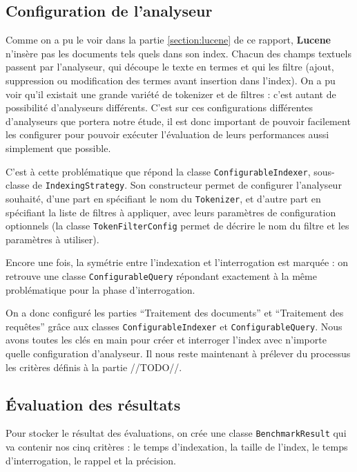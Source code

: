 \subsection{Configuration de l'analyseur}

Comme on a pu le voir dans la partie \ref{section:lucene} de ce rapport, \textbf{Lucene} n’insère pas les documents tels quels dans son index. Chacun des champs textuels passent par l’analyseur, qui découpe le texte en termes et qui les filtre (ajout, suppression ou modification des termes avant insertion dans l’index). On a pu voir qu’il existait une grande variété de tokenizer et de filtres : c’est autant de possibilité d’analyseurs différents. C’est sur ces configurations différentes d’analyseurs que portera notre étude, il est donc important de pouvoir facilement les configurer pour pouvoir exécuter l’évaluation de leurs performances aussi simplement que possible.

C’est à cette problématique que répond la classe \texttt{ConfigurableIndexer}, sous-classe de \texttt{IndexingStrategy}. Son constructeur permet de configurer l’analyseur souhaité, d’une part en spécifiant le nom du \texttt{Tokenizer}, et d’autre part en spécifiant la liste de filtres à appliquer, avec leurs paramètres de configuration optionnels (la classe \texttt{TokenFilterConfig} permet de décrire le nom du filtre et les paramètres à utiliser).

Encore une fois, la symétrie entre l’indexation et l’interrogation est marquée : on retrouve une classe \texttt{ConfigurableQuery} répondant exactement à la même problématique pour la phase d’interrogation.

On a donc configuré les parties “Traitement des documents” et “Traitement des requêtes” grâce aux classes \texttt{ConfigurableIndexer} et \texttt{ConfigurableQuery}. Nous avons toutes les clés en main pour créer et interroger l’index avec n’importe quelle configuration d’analyseur. Il nous reste maintenant à prélever du processus les critères définis à la partie //TODO//.

\subsection{Évaluation des résultats}
\label{section:benchmarkresults}

Pour stocker le résultat des évaluations, on crée une classe \texttt{BenchmarkResult} qui va contenir nos cinq critères : le temps d’indexation, la taille de l’index, le temps d’interrogation, le rappel et la précision.


